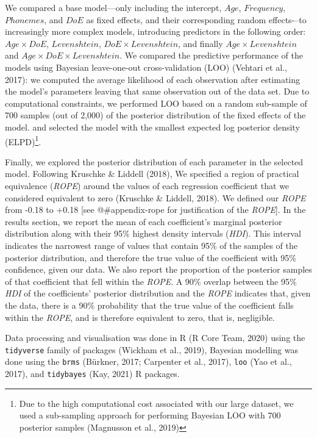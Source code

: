 \documentclass[
  letterpaper,
  DIV=11,
  numbers=noendperiod]{scrartcl}
\begin{document}
We compared a base model---only including the intercept, \(Age\),
\(Frequency\), \(Phonemes\), and \(DoE\) as fixed effects, and their
corresponding random effects-\/--to increasingly more complex models,
introducing predictors in the following order: \(Age \times DoE\),
\(Levenshtein\), \(DoE \times Levenshtein\), and finally
\(Age \times Levenshtein\) and \(Age \times DoE \times Levenshtein\). We
compared the predictive performance of the models using Bayesian
leave-one-out cross-validation (LOO) (Vehtari et al., 2017): we computed
the average likelihood of each observation after estimating the model's
parameters leaving that same observation out of the data set. Due to
computational constraints, we performed LOO based on a random sub-sample
of 700 samples (out of 2,000) of the posterior distribution of the fixed
effects of the model. and selected the model with the smallest expected
log posterior density (ELPD)\footnote{Due to the high computational cost
  associated with our large dataset, we used a sub-sampling approach for
  performing Bayesian LOO with 700 posterior samples (Magnusson et al.,
  2019)}.

Finally, we explored the posterior distribution of each parameter in the
selected model. Following Kruschke \& Liddell (2018), We specified a
region of practical equivalence (\emph{ROPE}) around the values of each
regression coefficient that we considered equivalent to zero (Kruschke
\& Liddell, 2018). We defined our \emph{ROPE} from -0.18 to +0.18 {[}see
@\#appendix-rope for justification of the \emph{ROPE}{]}. In the results
section, we report the mean of each coefficient's marginal posterior
distribution along with their 95\% highest density intervals
(\emph{HDI}). This interval indicates the narrowest range of values that
contain 95\% of the samples of the posterior distribution, and therefore
the true value of the coefficient with 95\% confidence, given our data.
We also report the proportion of the posterior samples of that
coefficient that fell within the \emph{ROPE}. A 90\% overlap between the
95\% \emph{HDI} of the coefficients' posterior distribution and the
\emph{ROPE} indicates that, given the data, there is a 90\% probability
that the true value of the coefficient falls within the \emph{ROPE}, and
is therefore equivalent to zero, that is, negligible.

Data processing and visualisation was done in R (R Core Team, 2020)
using the \texttt{tidyverse} family of packages (Wickham et al., 2019),
Bayesian modelling was done using the \texttt{brms} (Bürkner, 2017;
Carpenter et al., 2017), \texttt{loo} (Yao et al., 2017), and
\texttt{tidybayes} (Kay, 2021) R packages.
\end{document}
